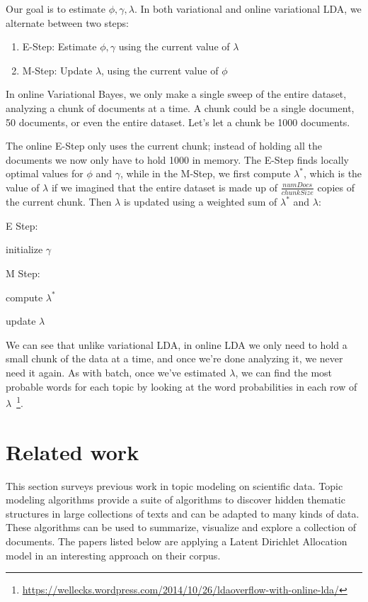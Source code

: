 \documentclass[12pt]{report}
\begin{document}
Our goal is to estimate $\phi, \gamma, \lambda$. In both variational 
and online variational LDA, we alternate between two steps:

\begin{enumerate}
\item E-Step: Estimate $\phi, \gamma$ using the current value of $\lambda$
\item M-Step: Update $\lambda$, using the current value of $\phi$
\end{enumerate}

In online Variational Bayes, we only make a single sweep of the entire dataset, 
analyzing a chunk of documents at a time. A chunk could be a single document, 
50 documents, or even the entire dataset. Let's let a chunk be 1000 documents.

The online E-Step only uses the current chunk; instead of holding all the 
documents we now only have to hold 1000 in memory. The E-Step finds locally 
optimal values for $\phi$ and $\gamma$, while in the M-Step, we first compute 
$\lambda^{*}$, which is the value of $\lambda$ if we imagined that the entire 
dataset is made up of $\frac{numDocs}{chunkSize}$ copies of the current chunk. 
Then $\lambda$ is updated using a weighted sum of $\lambda^{*}$ and
$\lambda$:
\begin{algorithm}
\SetAlgoNoLine
E Step:

initialize $\gamma$

M Step:

compute $\lambda^{*}$

update $\lambda$
\end{algorithm}

We can see that unlike variational LDA, in online LDA we only need to
hold a small chunk of the data at a time, and once we're done
analyzing it, we never need it again. As with batch, once we've
estimated $\lambda$, we can find the most probable words for each
topic by looking at the word probabilities in each row of
$\lambda$~\footnote{\url{https://wellecks.wordpress.com/2014/10/26/ldaoverflow-with-online-lda/}}.

\section{Related work}
\label{relatedwork}
This section surveys previous work in topic modeling on
scientific data. Topic modeling algorithms provide a
suite of algorithms to discover hidden thematic structures 
in large collections of texts and can be adapted to
many kinds of data. These algorithms can be used to summarize,
visualize and explore a collection of documents. The papers listed
below are applying a Latent Dirichlet Allocation model in an
interesting approach on their corpus.
\end{document}
